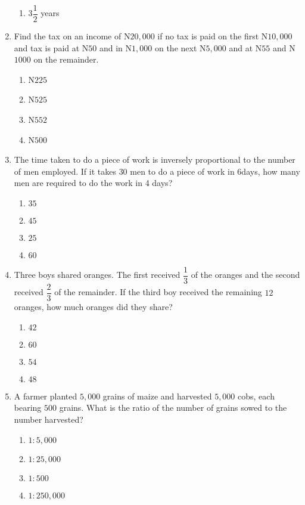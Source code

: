 \begin{multicols}{2}
\begin{enumerate}[label={\arabic*.}]
\begin{enumerate}[label={\Alph*.}]
    \item \(3\dfrac{1}{2}\) years
    \end{enumerate}
\item Find the tax on an income of N\(20,000\) if no tax is paid on the first N\(10,000\) and tax is paid at N\(50\) and in N\(1,000\)
on the next N\(5,000\) and at N\(55\) and N\(1000\) on the remainder. 
    \begin{enumerate}[label={\Alph*.}]
    \item N\(225\)
    \item N\(525\)
    \item N\(552\)
    \item N\(500\)
    \end{enumerate}
\item The time taken to do a piece of work is inversely proportional to the number of men employed. If it takes \(30\) men to do a piece of work in \(6\)days, how many men are required to do the work in 4 days?
    \begin{enumerate}[label={\Alph*.}]
    \item \(35\)
    \item \(45\)
    \item \(25\)
    \item \(60\)
    \end{enumerate}
\item Three boys shared oranges. The first received \(\dfrac{1}{3}\) of the oranges and the second received \(\dfrac{2}{3}\)
of the remainder. If the third boy received the remaining \(12\) oranges, how much oranges did they share?
    \begin{enumerate}[label={\Alph*.}]
    \item \(42\)
    \item \(60\)
    \item \(54\)
    \item \(48\)
    \end{enumerate}
\item A farmer planted \(5,000\) grains of maize and harvested \(5,000\) cobs, each bearing \(500\) grains. What is the ratio of the number of grains sowed 
to the number harvested? 
    \begin{enumerate}[label={\Alph*.}]
    \item \(1:5,000\)
    \item \(1:25,000\)
    \item \(1:500\)
    \item \(1:250,000\)
    \end{enumerate}

\end{enumerate}
\end{multicols}
